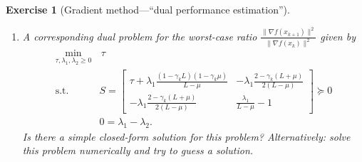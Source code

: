 \documentclass[11pt,a4paper]{article}
\newtheorem{exercise}{Exercise}
\begin{document}
\begin{exercise}[Gradient method---``dual performance estimation'']
\begin{enumerate}
	\item A corresponding dual problem for the worst-case ratio $\frac{\|\nabla f(x_{k+1})\|^2}{\|\nabla f(x_k)\|^2}$ given by
	\begin{equation}\label{eq:ex1_dual2}	 
		\begin{aligned}
			\min_{\tau,\lambda_1,\lambda_2\geqslant 0} & \,\tau\\
			\text{s.t. }& S=\begin{bmatrix}
		\tau+\lambda_1 \frac{(1-\gamma_k L)(1-\gamma_k \mu)}{L-\mu} & -\lambda_1\frac{2-\gamma_k(L+\mu)}{2(L-\mu)}\\
		-\lambda_1\frac{2-\gamma_k(L+\mu)}{2(L-\mu)} & \frac{\lambda_1}{L-\mu}-1
			\end{bmatrix}\succcurlyeq 0\\
			&0=\lambda_1-\lambda_2.
		\end{aligned}
		\end{equation} Is there a simple closed-form solution for this problem? Alternatively: solve this problem numerically and try to guess a solution.
		

\end{enumerate}
\end{exercise}
\end{document}
